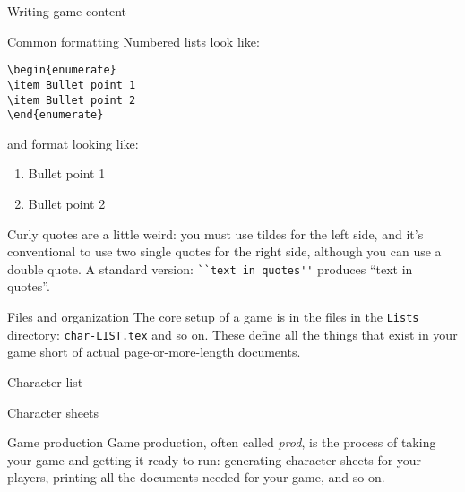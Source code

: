 \documentclass{article}
\begin{document}
\begin{section}{Writing game content}
\begin{subsection}{Common formatting}
Numbered lists look like:
\begin{verbatim}
\begin{enumerate}
\item Bullet point 1
\item Bullet point 2
\end{enumerate}
\end{verbatim}
and format looking like:
\begin{enumerate}
\item Bullet point 1
\item Bullet point 2
\end{enumerate}

Curly quotes are a little weird: you must use tildes for the left side, and it's conventional to use two single quotes for the right side, although you can use a double quote.  A standard version: \lstinline{``text in quotes''} produces ``text in quotes''.

\end{subsection}
\begin{subsection}{Files and organization}
The core setup of a game is in the files in the \lstinline{Lists} directory: \lstinline{char-LIST.tex} and so on.  These define all the things that exist in your game short of actual page-or-more-length documents.
\begin{subsubsection}{Character list}
\end{subsubsection}
\end{subsection}
\begin{subsection}{Character sheets}
\end{subsection}
\end{section}
\begin{section}{Game production}
Game production, often called \emph{prod}, is the process of taking your game and getting it ready to run: generating character sheets for your players, printing all the documents needed for your game, and so on.
\end{section}
\end{document}
